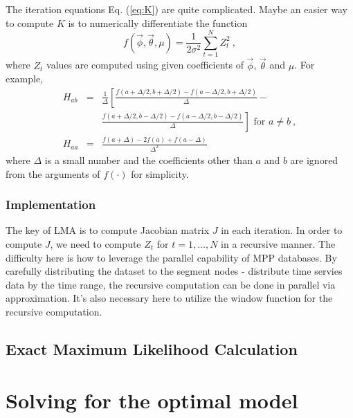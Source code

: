 The iteration equations Eq. (\ref{eq:K}) are quite complicated. Maybe
an easier way to compute $K$ is to numerically differentiate the
function
\begin{equation}
f(\vec{\phi},\vec{\theta},\mu) = \frac{1}{2\sigma^2}\sum_{t=1}^NZ_t^2\ ,
\end{equation}
where $Z_t$ values are computed using given coefficients of
$\vec{\phi}$, $\vec{\theta}$ and $\mu$.
For example,
\begin{eqnarray}
H_{ab} &=&
\frac{1}{\Delta}\left[\frac{f(a+\Delta/2,b+\Delta/2)-f(a-\Delta/2,b+\Delta/2)}{\Delta}
- \right. \nonumber\\
& & \left. \frac{f(a+\Delta/2,b-\Delta/2) - f(a-\Delta/2,b-\Delta/2)}{\Delta}\right] \mbox{ for } a\neq b \
, \\
H_{aa} &=& \frac{f(a+\Delta) - 2f(a) + f(a-\Delta)}{\Delta^2}
\end{eqnarray}
where $\Delta$ is a small number and the coefficients other than $a$
and $b$ are ignored from the arguments of $f(\cdot)$ for simplicity.


\subsubsection{Implementation}
The key of LMA is to compute Jacobian matrix $J$ in each iteration. In order to compute $J$, we need to compute $Z_t$ for $t=1,\dots,N$ in a recursive manner. The difficulty here is how to leverage the parallel capability of MPP databases. By carefully distributing the dataset to the segment nodes - distribute time servies data by the time range,  the recursive computation can be done in parallel via approximation. It's also necessary here to utilize the window function for the recursive computation.

\subsection{Exact Maximum Likelihood Calculation}



\section{Solving for the optimal model}\label{sec:model_opt}

